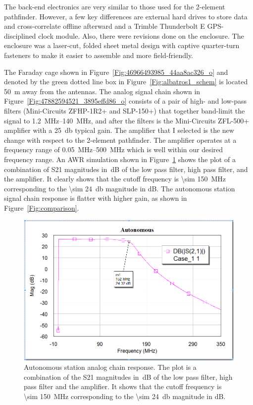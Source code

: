 The back-end electronics are very similar to those used for the 2-element pathfinder. However, a few key differences are external hard drives to store data and cross-correlate offline afterward and a Trimble Thunderbolt E GPS-disciplined clock module. Also, there were revisions done on the enclosure. The enclosure was a laser-cut, folded sheet metal design with captive quarter-turn fasteners to make it easier to assemble and more field-friendly.

The Faraday cage shown in Figure~\ref{Fig:46966493985_44aa8ac326_o} and denoted by the green dotted line box in Figure~\ref{Fig:albatros1_schem} is located \SI{50}{\meter} away from the antennas. The analog signal chain shown in Figure~\ref{Fig:47882594521_3895effd86_o} consists of a pair of high- and low-pass filters (Mini-Circuits ZFHP-1R2+ and SLP-150+) that together band-limit the signal to \SIrange{1.2}{140}{\mega\hertz}, and after the filters is the Mini-Circuits ZFL-500+ amplifier with a \SI{25}{\decibel} typical gain. The amplifier that I selected is the new change with respect to the 2-element pathfinder. The amplifier operates at a frequency range of \SIrange{0.05}{500}{\mega\hertz} which is well within our desired frequency range. An AWR simulation shown in Figure~\ref{Fig:auto} shows the plot of a combination of S21 magnitudes in~dB of the low pass filter, high pass filter, and the amplifier. It clearly shows that the cutoff frequency is \SI{\sim 150}{MHz} corresponding to the \SI{\sim 24}{\decibel} magnitude in dB. The autonomous station signal chain response is flatter with higher gain, as shown in Figure~\ref{Fig:comparison}.

\begin{figure}
	\centering
	\includegraphics[width=0.7\linewidth]{Figures/auto}
	\caption{Autonomous station analog chain response. The plot is a combination of the S21 magnitudes in~dB of the low pass filter, high pass filter and the amplifier. It shows that the cutoff frequency is \SI{\sim 150}{MHz} corresponding to the \SI{\sim 24}{\decibel} magnitude in dB.}
	\label{Fig:auto}
\end{figure}

